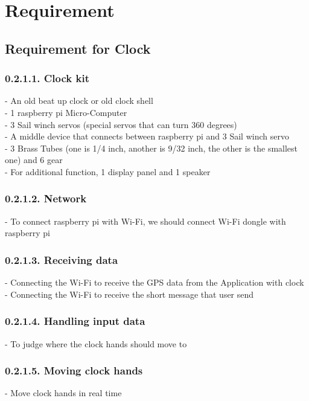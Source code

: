 \documentclass[10pt,a4paper,twocolumn]{report}
\begin{document}
\section{Requirement}
	\subsection{Requirement for Clock}
		\subsubsection{0.2.1.1. Clock kit} 
		- An old beat up clock or old clock shell \\
		- 1 raspberry pi Micro-Computer \\
		- 3 Sail winch servos (special servos that can turn 360 degrees)\\
		- A middle device that connects between raspberry pi and 3 Sail winch servo \\
		- 3 Brass Tubes (one is 1/4 inch, another is 9/32 inch, the other is the          
		  smallest one) and 6 gear \\
		- For additional function, 1 display panel and 1 speaker \\
		
		\subsubsection{0.2.1.2. Network} 
		- To connect raspberry pi with Wi-Fi, we should connect Wi-Fi dongle with 
		  raspberry pi \\
		  
		\subsubsection{0.2.1.3. Receiving data} 
		- Connecting the Wi-Fi to receive the GPS data from the Application with clock \\
        - Connecting the Wi-Fi to receive the short message that user send\\

		\subsubsection{0.2.1.4. Handling input data} 
		- To judge where the clock hands should move to \\
		
		\subsubsection{0.2.1.5. Moving clock hands} 
		- Move clock hands in real time \\
		
\end{document}

